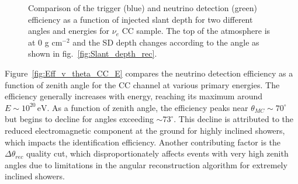 \begin{figure}[h!]
  \centering
  \hfill
  \caption{Comparison of the trigger (blue) and neutrino detection (green) efficiency as a function of injected slant depth for two different angles and energies for $\nu_e$ CC sample. The top of the atmosphere is at 0 g cm$^{-2}$ and the SD depth changes according to the angle as shown in fig.~\ref{fig:Slant_depth_rec}.} 
  \label{fig:Eff_X_comp}
\end{figure}

Figure~\ref{fig:Eff_v_theta_CC_E} compares the neutrino detection efficiency as a function of zenith angle for the CC channel at various primary energies. The efficiency generally increases with energy, reaching its maximum around \(E \sim 10^{20}\,\mathrm{eV}\). As a function of zenith angle, the efficiency peaks near \(\theta_{MC} \sim 70^\circ\) but begins to decline for angles exceeding \(\sim 73^\circ\). This decline is attributed to the reduced electromagnetic component at the ground for highly inclined showers, which impacts the identification efficiency. Another contributing factor is the \(\Delta \theta_{rec}\) quality cut, which disproportionately affects events with very high zenith angles due to limitations in the angular reconstruction algorithm for extremely inclined showers.

